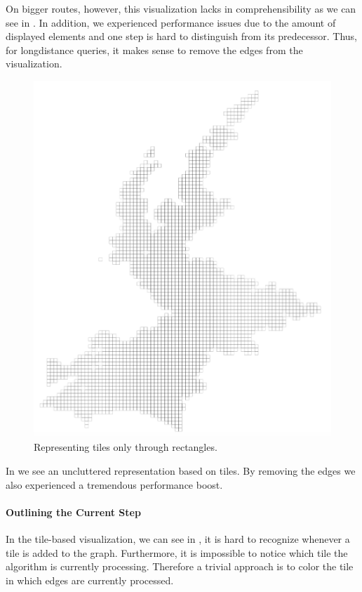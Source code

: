 \documentclass
[
    paper = a4,
    pagesize,
    12 pt,
    oneside,                       %
    open = right,
    DIV = calc,
    BCOR = 0 mm,                   %
    bibtotoc
]
{scrbook}
\begin{document}
On bigger routes, however, this visualization lacks in comprehensibility as we can see in .
In addition, we experienced performance issues due to the amount of displayed elements and one step is hard to distinguish from its predecessor.
Thus, for longdistance queries, it makes sense to remove the edges from the visualization.

\begin{figure}
        \includegraphics[width=\textwidth]{Images/vis-only-rectangles.png}
\caption[]{Representing tiles only through rectangles.}
\label{fig:only_rectangles}
\end{figure}

In  we see an uncluttered representation based on tiles.
By removing the edges we also experienced a tremendous performance boost.


\paragraph{Outlining the Current Step}

In the tile-based visualization, we can see in , it is hard to recognize whenever a tile is added to the graph.
Furthermore, it is impossible to notice which tile the algorithm is currently processing.
Therefore a trivial approach is to color the tile in which edges are currently processed.
\end{document}
